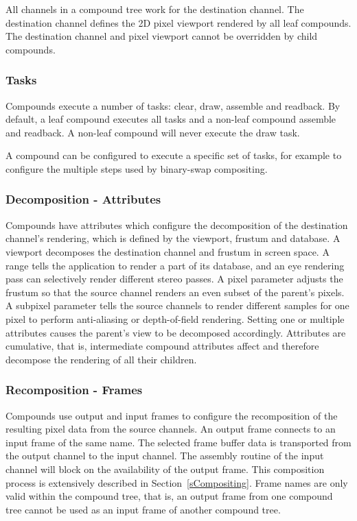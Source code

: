 \documentclass[10pt,a4]{scrartcl}
\newcommand{\sref}[1]{Section~\ref{#1}}
\begin{document}
All channels in a compound tree work for the destination channel. The
destination channel defines the 2D pixel viewport rendered by all leaf
compounds. The destination channel and pixel viewport cannot be
overridden by child compounds.

\subsubsection{Tasks}
Compounds execute a number of tasks: clear, draw, assemble and readback. By
default, a leaf compound executes all tasks and a non-leaf compound assemble and
readback. A non-leaf compound will never execute the draw task.

A compound can be configured to execute a specific set of tasks, for
example to configure the multiple steps used by binary-swap compositing.

\subsubsection{Decomposition - Attributes}
Compounds have attributes which configure the decomposition of the destination
channel's rendering, which is defined by the viewport, frustum and database. A
\textsf{viewport} decomposes the destination channel and frustum in screen
space. A \textsf{range} tells the application to render a part of its database,
and an \textsf{eye} rendering pass can selectively render different stereo
passes. A \textsf{pixel} parameter adjusts the frustum so that the source
channel renders an even subset of the parent's pixels. A \textsf{subpixel}
parameter tells the source channels to render different samples for one pixel to
perform anti-aliasing or depth-of-field rendering. Setting one or multiple
attributes causes the parent's view to be decomposed accordingly. Attributes are
cumulative, that is, intermediate compound attributes affect and therefore
decompose the rendering of all their children.

\subsubsection{Recomposition - Frames}
Compounds use output and input frames to configure the recomposition of
the resulting pixel data from the source channels. An output frame
connects to an input frame of the same name. The selected frame buffer
data is transported from the output channel to the input channel. The
assembly routine of the input channel will block on the availability of
the output frame. This composition process is extensively described in
\sref{sCompositing}. Frame names are only valid within the compound
tree, that is, an output frame from one compound tree cannot be used as
an input frame of another compound tree.
\end{document}
